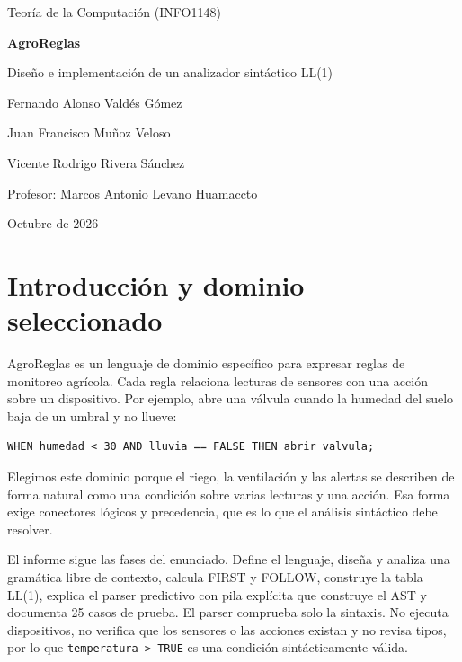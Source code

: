 \documentclass[11pt,a4paper]{article}
\begin{document}
\begin{titlepage}
  \centering
  \vspace*{3cm}
  {\large Teoría de la Computación (INFO1148)\par}
  \vspace{2cm}
  {\Huge\bfseries AgroReglas\par}
  \vspace{0.6cm}
  {\Large Diseño e implementación de un analizador sintáctico LL(1)\par}
  \vspace{2.5cm}
  {\large Fernando Alonso Valdés Gómez\par}
  {\large Juan Francisco Muñoz Veloso\par}
  {\large Vicente Rodrigo Rivera Sánchez\par}
  \vspace{0.8cm}
  {\large Profesor: Marcos Antonio Levano Huamaccto\par}
  \vfill
  {\large Octubre de 2026\par}
\end{titlepage}

\setcounter{tocdepth}{1}
\tableofcontents
\clearpage

\section{Introducción y dominio seleccionado}

AgroReglas es un lenguaje de dominio específico para expresar reglas
de monitoreo agrícola. Cada regla relaciona lecturas de sensores con
una acción sobre un dispositivo. Por ejemplo, abre una válvula cuando
la humedad del suelo baja de un umbral y no llueve:

\begin{Verbatim}
WHEN humedad < 30 AND lluvia == FALSE THEN abrir valvula;
\end{Verbatim}

Elegimos este dominio porque el riego, la ventilación y las alertas
se describen de forma natural como una condición sobre varias
lecturas y una acción. Esa forma exige conectores lógicos y
precedencia, que es lo que el análisis sintáctico debe resolver.

El informe sigue las fases del enunciado. Define el lenguaje, diseña
y analiza una gramática libre de contexto, calcula FIRST y FOLLOW,
construye la tabla LL(1), explica el parser predictivo con pila
explícita que construye el AST y documenta 25 casos de prueba. El
parser comprueba solo la sintaxis. No ejecuta dispositivos, no
verifica que los sensores o las acciones existan y no revisa tipos,
por lo que \texttt{temperatura > TRUE} es una condición sintácticamente válida.
\end{document}
